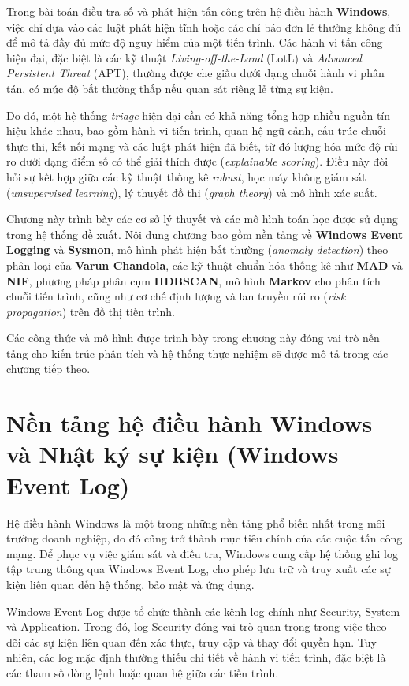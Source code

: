 \documentclass[../main.tex]{subfiles}
\begin{document}
Trong bài toán điều tra số và phát hiện tấn công trên hệ điều hành \textbf{Windows}, việc chỉ dựa vào các luật phát hiện tĩnh hoặc các chỉ báo đơn lẻ thường không đủ để mô tả đầy đủ mức độ nguy hiểm của một tiến trình. Các hành vi tấn công hiện đại, đặc biệt là các kỹ thuật \textit{Living-off-the-Land} (LotL) và \textit{Advanced Persistent Threat} (APT), thường được che giấu dưới dạng chuỗi hành vi phân tán, có mức độ bất thường thấp nếu quan sát riêng lẻ từng sự kiện.

Do đó, một hệ thống \textit{triage} hiện đại cần có khả năng tổng hợp nhiều nguồn tín hiệu khác nhau, bao gồm hành vi tiến trình, quan hệ ngữ cảnh, cấu trúc chuỗi thực thi, kết nối mạng và các luật phát hiện đã biết, từ đó lượng hóa mức độ rủi ro dưới dạng điểm số có thể giải thích được (\textit{explainable scoring}). Điều này đòi hỏi sự kết hợp giữa các kỹ thuật thống kê \textit{robust}, học máy không giám sát (\textit{unsupervised learning}), lý thuyết đồ thị (\textit{graph theory}) và mô hình xác suất.

Chương này trình bày các cơ sở lý thuyết và các mô hình toán học được sử dụng trong hệ thống đề xuất. Nội dung chương bao gồm nền tảng về \textbf{Windows Event Logging} và \textbf{Sysmon}, mô hình phát hiện bất thường (\textit{anomaly detection}) theo phân loại của \textbf{Varun Chandola}, các kỹ thuật chuẩn hóa thống kê như \textbf{MAD} và \textbf{NIF}, phương pháp phân cụm \textbf{HDBSCAN}, mô hình \textbf{Markov} cho phân tích chuỗi tiến trình, cũng như cơ chế định lượng và lan truyền rủi ro (\textit{risk propagation}) trên đồ thị tiến trình.

Các công thức và mô hình được trình bày trong chương này đóng vai trò nền tảng cho kiến trúc phân tích và hệ thống thực nghiệm sẽ được mô tả trong các chương tiếp theo.

\section{Nền tảng hệ điều hành Windows và Nhật ký sự kiện (Windows Event Log)}
\label{section:2.1}
Hệ điều hành Windows là một trong những nền tảng phổ biến nhất trong môi trường doanh nghiệp, do đó cũng trở thành mục tiêu chính của các cuộc tấn công mạng. Để phục vụ việc giám sát và điều tra, Windows cung cấp hệ thống ghi log tập trung thông qua Windows Event Log, cho phép lưu trữ và truy xuất các sự kiện liên quan đến hệ thống, bảo mật và ứng dụng.

Windows Event Log được tổ chức thành các kênh log chính như Security, System và Application. Trong đó, log Security đóng vai trò quan trọng trong việc theo dõi các sự kiện liên quan đến xác thực, truy cập và thay đổi quyền hạn. Tuy nhiên, các log mặc định thường thiếu chi tiết về hành vi tiến trình, đặc biệt là các tham số dòng lệnh hoặc quan hệ giữa các tiến trình.
\end{document}
